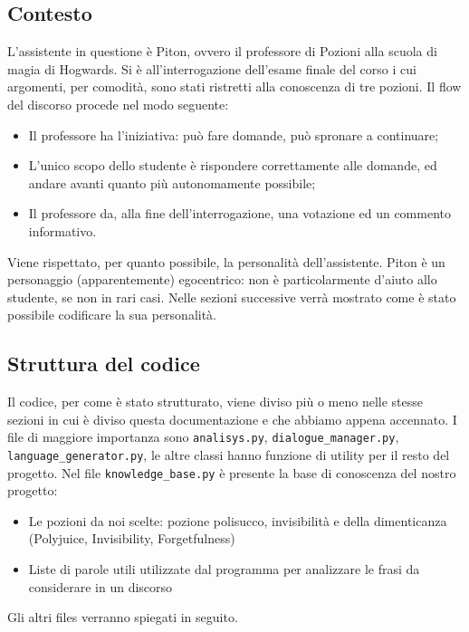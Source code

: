 \subsection{Contesto}
L'assistente in questione è Piton, ovvero il professore di Pozioni alla scuola di magia di Hogwards. Si è all'interrogazione dell'esame finale del corso i cui argomenti, per comodità, sono stati ristretti alla conoscenza di tre pozioni. Il flow del discorso procede nel modo seguente:
\begin{itemize}
    \item Il professore ha l'iniziativa: può fare domande, può spronare a continuare;
    \item L'unico scopo dello studente è rispondere correttamente alle domande, ed andare avanti quanto più autonomamente possibile;
    \item Il professore da, alla fine dell'interrogazione, una votazione ed un commento informativo.
\end{itemize}
Viene rispettato, per quanto possibile, la personalità dell'assistente. Piton è un personaggio (apparentemente) egocentrico: non è particolarmente d'aiuto allo studente, se non in rari casi. Nelle sezioni successive verrà mostrato come è stato possibile codificare la sua personalità.

\subsection{Struttura del codice}
Il codice, per come è stato strutturato, viene diviso più o meno nelle stesse sezioni in cui è diviso questa documentazione e che abbiamo appena accennato. I file di maggiore importanza sono \texttt{analisys.py}, \texttt{dialogue\_manager.py}, \texttt{language\_generator.py}, le altre classi hanno funzione di utility per il resto del progetto.
Nel file \texttt{knowledge\_base.py} è presente la base di conoscenza del nostro progetto:
\begin{itemize}
    \item Le pozioni da noi scelte: pozione polisucco, invisibilità e della dimenticanza (Polyjuice, Invisibility, Forgetfulness)
    \item Liste di parole utili utilizzate dal programma per analizzare le frasi da considerare in un discorso
\end{itemize}
Gli altri files verranno spiegati in seguito.


